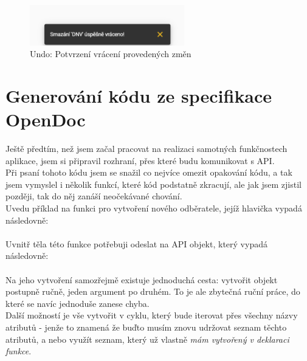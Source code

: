 \begin{figure}[]
\includegraphics[width=0.6\textwidth]{../png/app/undo_snack_after.png}
\caption{Undo: Potvrzení vrácení provedených změn} \label{picture:undo-after}
\end{figure}


\section{Generování kódu ze specifikace OpenDoc}\label{implementation:codegen}

Ještě předtím, než jsem začal pracovat na realizaci samotných funkčnostech aplikace, jsem si připravil rozhraní, přes které budu komunikovat s API.\\
Při psaní tohoto kódu jsem se snažil co nejvíce omezit opakování kódu, a tak jsem vymyslel i několik funkcí, které kód podstatně zkracují, ale jak jsem zjistil později, tak do něj zanáší neočekávané chování.\\
Uvedu příklad na funkci pro vytvoření nového odběratele, jejíž hlavička vypadá následovně:\\
\\
Uvnitř těla této funkce potřebuji odeslat na API objekt, který vypadá následovně:\\
\\
Na jeho vytvoření samozřejmě existuje jednoduchá cesta: vytvořit objekt postupně ručně, jeden argument po druhém. To je ale zbytečná ruční práce, do které se navíc jednoduše zanese chyba.\\
Další možností je vše vytvořit v cyklu, který bude iterovat přes všechny názvy atributů - jenže to znamená že buďto musím znovu udržovat seznam těchto atributů, a nebo využít seznam, který už vlastně \emph{mám vytvořený v deklaraci funkce}.\\

